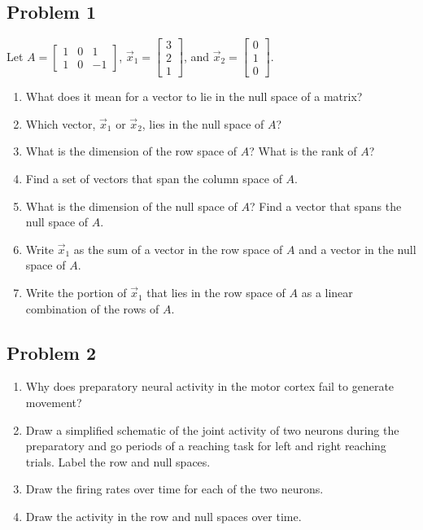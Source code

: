 \documentclass[11pt]{article}
\begin{document}
\subsection*{Problem 1}
Let $A=\begin{bmatrix}
    1 & 0 & 1\\ 1 & 0 & -1
\end{bmatrix}$, $\vec{x}_1=\begin{bmatrix} 3\\ 2 \\ 1\end{bmatrix}$, and $\vec{x}_2=\begin{bmatrix} 0\\ 1 \\ 0 \end{bmatrix}$.
\begin{enumerate}
    \item[(a)] What does it mean for a vector to lie in the null space of a matrix?
    \item[(b)] Which vector, $\vec{x}_1$ or $\vec{x}_2$, lies in the null space of $A$?
    \item[(c)] What is the dimension of the row space of $A$? What is the rank of $A$?
    \item[(d)] Find a set of vectors that span the column space of $A$. 
    \item[(e)] What is the dimension of the null space of $A$? Find a vector that spans the null space of $A$.
    \item[(f)] Write $\vec{x}_1$ as the sum of a vector in the row space of $A$ and a vector in the null space of $A$.
    \item[(g)] Write the portion of $\vec{x}_1$ that lies in the row space of $A$ as a linear combination of the rows of $A$.
\end{enumerate}

\subsection*{Problem 2}
\begin{enumerate}
    \item[(a)] Why does preparatory neural activity in the motor cortex fail to generate movement?
    \item[(b)] Draw a simplified schematic of the joint activity of two neurons during the preparatory and go periods of a reaching task for left and right reaching trials. Label the row and null spaces.
    \item[(c)] Draw the firing rates over time for each of the two neurons.
    \item[(d)] Draw the activity in the row and null spaces over time.
\end{enumerate}
\end{document}
